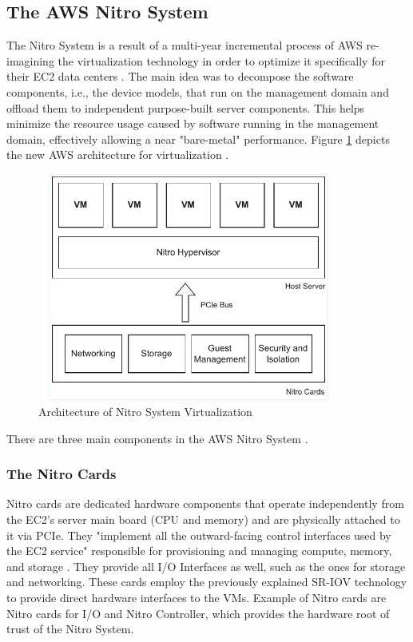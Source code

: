 \subsection{The AWS Nitro System}
The Nitro System is a result of a multi-year incremental process of AWS re-imagining the virtualization 
technology in order to optimize it specifically for their EC2 data centers \cite{nitro_whitepaper}. 
The main idea was to decompose the software components, i.e., the device models, 
that run on the management domain and offload them to independent purpose-built server components. 
This helps minimize the resource usage caused by software running in the management domain, effectively 
allowing a near "bare-metal" performance. Figure \ref{fig:nitro} depicts the new AWS
architecture for virtualization \cite{nitro_whitepaper}. 
\begin{figure}[H]
  \centering
  \includegraphics[width=10cm, height=7.5cm]{figures/nitro}
  \caption{Architecture of Nitro System Virtualization}
  \label{fig:nitro}
\end{figure}
\noindent
There are three main components in the AWS Nitro System \cite{nitro_whitepaper}. 
\subsubsection{The Nitro Cards}
Nitro cards are dedicated hardware components that operate independently from the EC2's server main board 
(CPU and memory) and are physically attached to it via PCIe. They "implement all the outward-facing 
control interfaces used by the EC2 service" responsible for provisioning and managing compute, memory, 
and storage \cite{nitro_whitepaper}. They provide all I/O Interfaces as well, such 
as the ones for storage and networking. These cards employ the previously explained SR-IOV technology to 
provide direct hardware interfaces to the VMs. Example of Nitro cards are Nitro cards for I/O and 
Nitro Controller, which provides the hardware root of trust of the Nitro System. 

